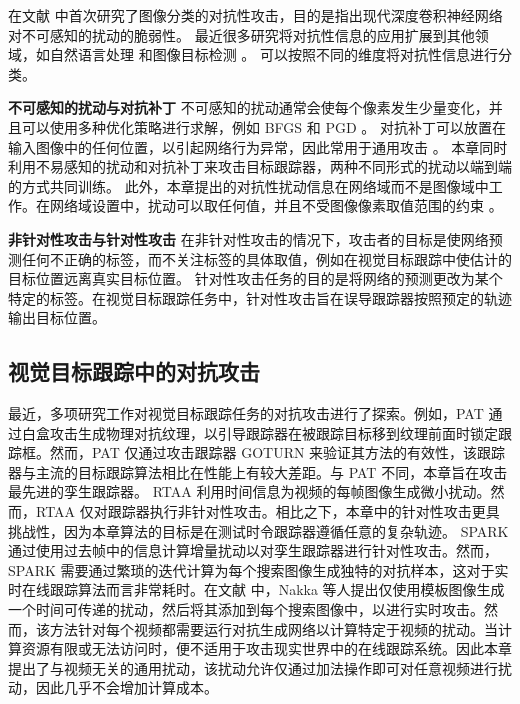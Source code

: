 在文献 \cite{intriguing} 中首次研究了图像分类的对抗性攻击，目的是指出现代深度卷积神经网络对不可感知的扰动的脆弱性。
最近很多研究将对抗性信息的应用扩展到其他领域，如自然语言处理 \cite{generating} 和图像目标检测 \cite{wei2019transferable}。
可以按照不同的维度将对抗性信息进行分类。

\textbf{不可感知的扰动与对抗补丁} 不可感知的扰动通常会使每个像素发生少量变化，并且可以使用多种优化策略进行求解，例如 BFGS \cite{intriguing} 和 PGD \cite{PGD}。
对抗补丁可以放置在输入图像中的任何位置，以引起网络行为异常，因此常用于通用攻击 \cite{patch}。
本章同时利用不易感知的扰动和对抗补丁来攻击目标跟踪器，两种不同形式的扰动以端到端的方式共同训练。
此外，本章提出的对抗性扰动信息在网络域而不是图像域中工作。在网络域设置中，扰动可以取任何值，并且不受图像像素取值范围的约束 \cite{karmon2018lavan}。

\textbf{非针对性攻击与针对性攻击} 在非针对性攻击的情况下，攻击者的目标是使网络预测任何不正确的标签，而不关注标签的具体取值，例如在视觉目标跟踪中使估计的目标位置远离真实目标位置。
针对性攻击任务的目的是将网络的预测更改为某个特定的标签。在视觉目标跟踪任务中，针对性攻击旨在误导跟踪器按照预定的轨迹输出目标位置。

\subsection{视觉目标跟踪中的对抗攻击}

最近，多项研究工作对视觉目标跟踪任务的对抗攻击进行了探索。例如，PAT \cite{PAT} 通过白盒攻击生成物理对抗纹理，以引导跟踪器在被跟踪目标移到纹理前面时锁定跟踪框。然而，PAT 仅通过攻击跟踪器 GOTURN \cite{GOTURN} 来验证其方法的有效性，该跟踪器与主流的目标跟踪算法相比在性能上有较大差距。与 PAT 不同，本章旨在攻击最先进的孪生跟踪器。
RTAA \cite{RTAA} 利用时间信息为视频的每帧图像生成微小扰动。然而，RTAA 仅对跟踪器执行非针对性攻击。相比之下，本章中的针对性攻击更具挑战性，因为本章算法的目标是在测试时令跟踪器遵循任意的复杂轨迹。
SPARK \cite{SPARK} 通过使用过去帧中的信息计算增量扰动以对孪生跟踪器进行针对性攻击。然而，SPARK 需要通过繁琐的迭代计算为每个搜索图像生成独特的对抗样本，这对于实时在线跟踪算法而言非常耗时。在文献 \cite{TTP} 中，Nakka 等人提出仅使用模板图像生成一个时间可传递的扰动，然后将其添加到每个搜索图像中，以进行实时攻击。然而，该方法针对每个视频都需要运行对抗生成网络以计算特定于视频的扰动。当计算资源有限或无法访问时，便不适用于攻击现实世界中的在线跟踪系统。因此本章提出了与视频无关的通用扰动，该扰动允许仅通过加法操作即可对任意视频进行扰动，因此几乎不会增加计算成本。

